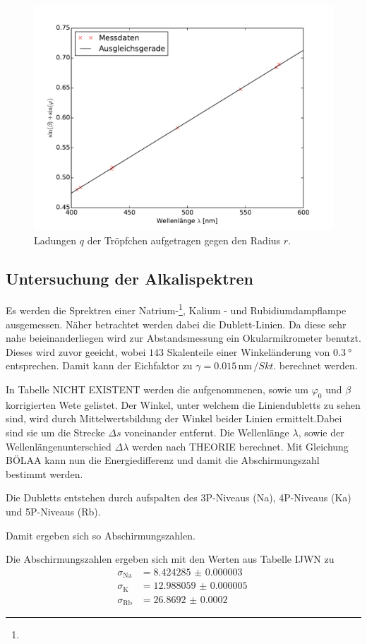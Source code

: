 \begin{figure}
	\centering
	\includegraphics[width=\textwidth]{Bilder/Gitterkonstante.pdf}
	\caption{Ladungen $q$ der Tröpfchen aufgetragen gegen den Radius $r$.}
	\label{fig:gitterkonst}
\end{figure}


\subsection{Untersuchung der Alkalispektren}

Es werden die Sprektren einer Natrium-\footnote{\Bat}, Kalium - und Rubidiumdampflampe ausgemessen. Näher betrachtet werden dabei die Dublett-Linien. Da diese sehr nahe beieinanderliegen wird zur Abstandsmessung ein Okularmikrometer benutzt. Dieses wird zuvor geeicht, wobei $143$ Skalenteile einer Winkeländerung von $\SI{0,3}{\degree}$ entsprechen. Damit kann der Eichfaktor zu $\gamma=0.015\,\si{\nano\meter}\,/Skt.$ berechnet werden. 

In Tabelle NICHT EXISTENT werden die aufgenommenen, sowie um $\varphi_0$ und $\beta$ korrigierten Wete gelistet. Der Winkel, unter welchem die Liniendubletts zu sehen sind, wird durch Mittelwertsbildung der Winkel beider Linien ermittelt.Dabei sind sie um die Strecke $\Delta{s}$ voneinander entfernt. Die Wellenlänge $\lambda$, sowie der Wellenlängenunterschied $\Delta{\lambda}$ werden nach THEORIE berechnet. Mit Gleichung BÖLAA kann nun die Energiedifferenz und damit die Abschirmungszahl bestimmt werden.

Die Dubletts entstehen durch aufspalten des 3P-Niveaus (Na), 4P-Niveaus (Ka) und 5P-Niveaus (Rb).

Damit ergeben sich so Abschirmungszahlen.

Die Abschirmungszahlen ergeben sich mit den Werten aus Tabelle IJWN zu 
\begin{align}
\sigma_\mathup{Na}&=\SI{8.424285(3)}{} \\
\sigma_\mathup{K\:}&=\SI{12.988059(5)}{}\\
\sigma_\mathup{Rb}&=\SI{26.8692(2)}{}
\end{align}
